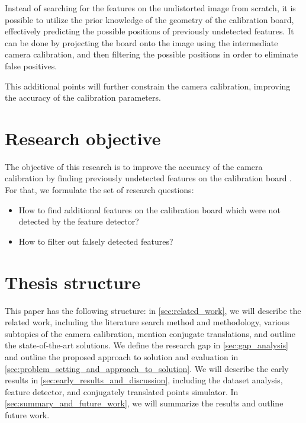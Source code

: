 Instead of searching for the features on the undistorted image from scratch, it
is possible to utilize the prior knowledge of the geometry of the calibration
board, effectively predicting the possible positions of previously undetected
features. It can be done by projecting the board onto the image using the
intermediate camera calibration, and then filtering the possible positions in
order to eliminate false positives.

This additional points will further constrain the camera calibration, improving
the accuracy of the calibration parameters.

\section{Research objective}\label{sec:research_objective}

The objective of this research is to improve the accuracy of the camera
calibration by finding previously undetected features on the calibration
board . For
that, we formulate the set of research questions:
\begin{itemize}
  \item How to find additional features on the calibration board which were not
    detected by the feature detector?
  \item How to filter out falsely detected features?
\end{itemize}

\section{Thesis structure}\label{sec:thesis_structure}

This paper has the following structure: in \autoref{sec:related_work}, we will describe the related work, including the
literature search method and methodology, various subtopics of the camera
calibration, mention conjugate translations, and outline the state-of-the-art
solutions. We define the research gap in \autoref{sec:gap_analysis} and outline
the proposed approach to solution and evaluation in
\autoref{sec:problem_setting_and_approach_to_solution}. We will describe the
early results in \autoref{sec:early_results_and_discussion}, including the
dataset analysis, feature detector, and conjugately translated points simulator.
In \autoref{sec:summary_and_future_work}, we will summarize the results and
outline future work.

\endinput


